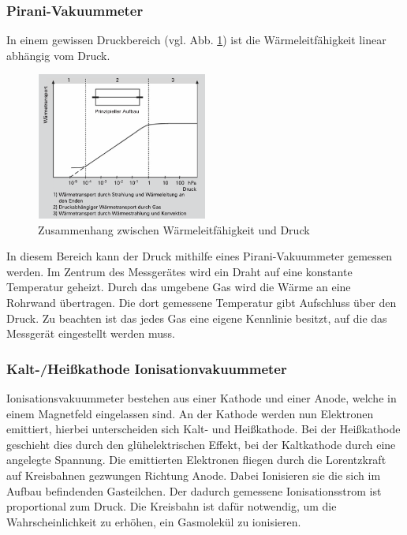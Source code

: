 \subsubsection{Pirani-Vakuummeter}
In einem gewissen Druckbereich (vgl. Abb. \ref{fig:wärme}) ist die Wärmeleitfähigkeit linear abhängig vom Druck.
\begin{figure}[h]
    \centering
    \includegraphics[width=0.5\textwidth]{abb/waerme.png}
    \caption{Zusammenhang zwischen Wärmeleitfähigkeit und Druck \cite{Pfeifer}}
    \label{fig:wärme}
\end{figure}
In diesem Bereich kann der Druck mithilfe eines Pirani-Vakuummeter gemessen werden.
Im Zentrum des Messgerätes wird ein Draht auf eine konstante Temperatur geheizt.
Durch das umgebene Gas wird die Wärme an eine Rohrwand übertragen.
Die dort gemessene Temperatur gibt Aufschluss über den Druck.
Zu beachten ist das jedes Gas eine eigene Kennlinie besitzt,
auf die das Messgerät eingestellt werden muss.

\subsubsection{Kalt-/Heißkathode Ionisationvakuummeter}
Ionisationsvakuummeter bestehen aus einer Kathode und einer Anode,
welche in einem Magnetfeld eingelassen sind.
An der Kathode werden nun Elektronen emittiert,
hierbei unterscheiden sich Kalt- und Heißkathode.
Bei der Heißkathode geschieht dies durch den glühelektrischen Effekt,
bei der Kaltkathode durch eine angelegte Spannung.
Die emittierten Elektronen fliegen
durch die Lorentzkraft auf Kreisbahnen gezwungen
Richtung Anode.
Dabei Ionisieren sie die sich im Aufbau befindenden Gasteilchen.
Der dadurch gemessene Ionisationsstrom ist proportional zum Druck.
Die Kreisbahn ist dafür notwendig,
um die Wahrscheinlichkeit zu erhöhen, ein Gasmolekül zu ionisieren. 
